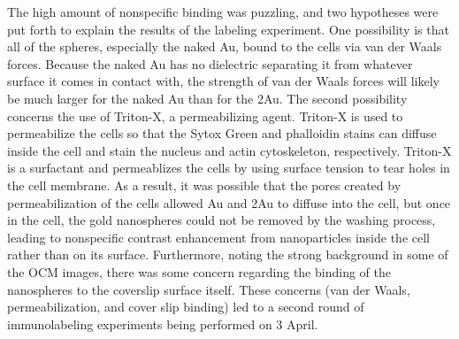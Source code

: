 The high amount of nonspecific binding was puzzling, and two hypotheses were put forth to explain the results of the labeling experiment. One possibility is that all of the spheres, especially the naked Au, bound to the cells via van der Waals forces. Because the naked Au has no dielectric separating it from whatever surface it comes in contact with, the strength of van der Waals forces will likely be much larger for the naked Au than for the 2Au. The second possibility concerns the use of Triton-X, a permeabilizing agent. Triton-X is used to permeabilize the cells so that the Sytox Green and phalloidin stains can diffuse inside the cell and stain the nucleus and actin cytoskeleton, respectively. Triton-X is a surfactant and permeablizes the cells by using surface tension to tear holes in the cell membrane. As a result, it was possible that the pores created by permeabilization of the cells allowed Au and 2Au to diffuse into the cell, but once in the cell, the gold nanospheres could not be removed by the washing process, leading to nonspecific contrast enhancement from nanoparticles inside the cell rather than on its surface. Furthermore, noting the strong background in some of the OCM images, there was some concern regarding the binding of the nanospheres to the coverslip surface itself. These concerns (van der Waals, permeabilization, and cover slip binding) led to a second round of immunolabeling experiments being performed on 3 April.

